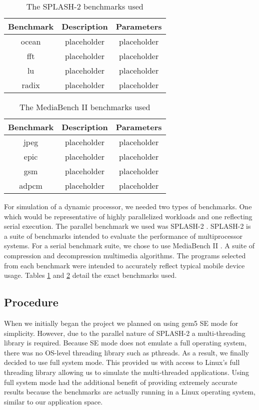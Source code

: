 \begin{table}[!t]
	\renewcommand{\arraystretch}{1.9}
	\centering
	\begin{tabular}{|c|c|c|}
		\hline
		Benchmark & Description & Parameters\\
		\hline
		ocean & placeholder & placeholder\\
		\hline
		fft & placeholder & placeholder\\
		\hline
		lu & placeholder & placeholder\\
		\hline
		radix & placeholder & placeholder\\
		\hline
	\end{tabular}
	\caption{The SPLASH-2 benchmarks used}
	\label{tab:splash2_benchmarks}
\end{table}

\begin{table}[!t]
	\renewcommand{\arraystretch}{1.9}
	\centering
	\begin{tabular}{|c|c|c|}
		\hline
		Benchmark & Description & Parameters\\
		\hline
		jpeg & placeholder & placeholder\\
		\hline
		epic & placeholder & placeholder\\
		\hline
		gsm & placeholder & placeholder\\
		\hline
		adpcm & placeholder & placeholder\\
		\hline
	\end{tabular}
	\caption{The MediaBench II benchmarks used}
	\label{tab:mb2_benchmarks}
\end{table}

For simulation of a dynamic processor, we needed two types of benchmarks. One which would be representative of highly parallelized workloads and one reflecting serial execution. The parallel benchmark we used was SPLASH-2 \cite{splash2}. SPLASH-2 is a suite of benchmarks intended to evaluate the performance of multiprocessor systems. For a serial benchmark suite, we chose to use MediaBench II \cite{mb2}. A suite of compression and decompression multimedia algorithms. The programs selected from each benchmark were intended to accurately reflect typical mobile device usage. Tables \ref{tab:splash2_benchmarks} and \ref{tab:mb2_benchmarks} detail the exact benchmarks used.

\subsection{Procedure}
When we initially began the project we planned on using gem5 SE mode for simplicity. However, due to the parallel nature of SPLASH-2 a multi-threading library is required. Because SE mode does not emulate a full operating system, there was no OS-level threading library such as pthreads. As a result, we finally decided to use full system mode. This provided us with access to Linux's full threading library allowing us to simulate the multi-threaded applications. Using full system mode had the additional benefit of providing extremely accurate results because the benchmarks are actually running in a Linux operating system, similar to our application space.

